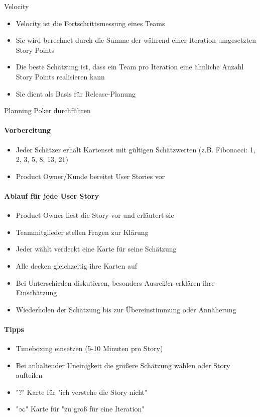 \begin{definition}{Velocity}\\
    \begin{itemize}
        \item Velocity ist die Fortschrittsmessung eines Teams
        \item Sie wird berechnet durch die Summe der während einer Iteration umgesetzten Story Points
        \item Die beste Schätzung ist, dass ein Team pro Iteration eine ähnliche Anzahl Story Points realisieren kann
        \item Sie dient als Basis für Release-Planung
    \end{itemize}
\end{definition}

\begin{KR}{Planning Poker durchführen}\\
    \paragraph{Vorbereitung}
    \begin{itemize}
        \item Jeder Schätzer erhält Kartenset mit gültigen Schätzwerten (z.B. Fibonacci: 1, 2, 3, 5, 8, 13, 21)
        \item Product Owner/Kunde bereitet User Stories vor
    \end{itemize}
    
    \paragraph{Ablauf für jede User Story}
    \begin{itemize}
        \item Product Owner liest die Story vor und erläutert sie
        \item Teammitglieder stellen Fragen zur Klärung
        \item Jeder wählt verdeckt eine Karte für seine Schätzung
        \item Alle decken gleichzeitig ihre Karten auf
        \item Bei Unterschieden diskutieren, besonders Ausreißer erklären ihre Einschätzung
        \item Wiederholen der Schätzung bis zur Übereinstimmung oder Annäherung
    \end{itemize}
    
    \paragraph{Tipps}
    \begin{itemize}
        \item Timeboxing einsetzen (5-10 Minuten pro Story)
        \item Bei anhaltender Uneinigkeit die größere Schätzung wählen oder Story aufteilen
        \item "?" Karte für "ich verstehe die Story nicht"
        \item "$\infty$" Karte für "zu groß für eine Iteration"
    \end{itemize}
\end{KR}

